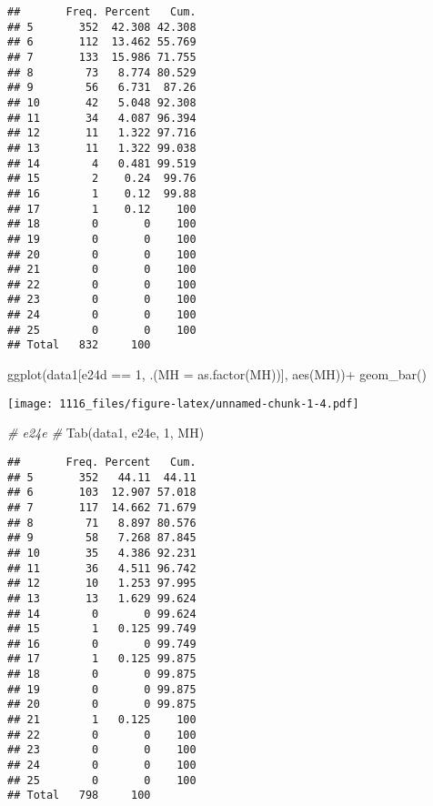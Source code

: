 \documentclass[
]{article}
\newenvironment{Shaded}{\begin{snugshade}}{\end{snugshade}}
\newcommand{\AttributeTok}[1]{\textcolor[rgb]{0.77,0.63,0.00}{#1}}
\newcommand{\CommentTok}[1]{\textcolor[rgb]{0.56,0.35,0.01}{\textit{#1}}}
\newcommand{\DecValTok}[1]{\textcolor[rgb]{0.00,0.00,0.81}{#1}}
\newcommand{\FunctionTok}[1]{\textcolor[rgb]{0.00,0.00,0.00}{#1}}
\newcommand{\NormalTok}[1]{#1}
\newcommand{\SpecialCharTok}[1]{\textcolor[rgb]{0.00,0.00,0.00}{#1}}
\newcommand{\StringTok}[1]{\textcolor[rgb]{0.31,0.60,0.02}{#1}}
\begin{document}
\begin{verbatim}
##       Freq. Percent   Cum.
## 5       352  42.308 42.308
## 6       112  13.462 55.769
## 7       133  15.986 71.755
## 8        73   8.774 80.529
## 9        56   6.731  87.26
## 10       42   5.048 92.308
## 11       34   4.087 96.394
## 12       11   1.322 97.716
## 13       11   1.322 99.038
## 14        4   0.481 99.519
## 15        2    0.24  99.76
## 16        1    0.12  99.88
## 17        1    0.12    100
## 18        0       0    100
## 19        0       0    100
## 20        0       0    100
## 21        0       0    100
## 22        0       0    100
## 23        0       0    100
## 24        0       0    100
## 25        0       0    100
## Total   832     100
\end{verbatim}

\begin{Shaded}
\begin{Highlighting}[]
\FunctionTok{ggplot}\NormalTok{(data1[e24d }\SpecialCharTok{==} \DecValTok{1}\NormalTok{, .(}\AttributeTok{MH =} \FunctionTok{as.factor}\NormalTok{(MH))], }\FunctionTok{aes}\NormalTok{(MH))}\SpecialCharTok{+}
    \FunctionTok{geom\_bar}\NormalTok{()}
\end{Highlighting}
\end{Shaded}

\texttt{[image: 1116\_files/figure-latex/unnamed-chunk-1-4.pdf]}

\begin{Shaded}
\begin{Highlighting}[]
\CommentTok{\# e24e \#}
\FunctionTok{Tab}\NormalTok{(data1, }\StringTok{\textquotesingle{}e24e\textquotesingle{}}\NormalTok{, }\DecValTok{1}\NormalTok{, }\StringTok{\textquotesingle{}MH\textquotesingle{}}\NormalTok{)}
\end{Highlighting}
\end{Shaded}

\begin{verbatim}
##       Freq. Percent   Cum.
## 5       352   44.11  44.11
## 6       103  12.907 57.018
## 7       117  14.662 71.679
## 8        71   8.897 80.576
## 9        58   7.268 87.845
## 10       35   4.386 92.231
## 11       36   4.511 96.742
## 12       10   1.253 97.995
## 13       13   1.629 99.624
## 14        0       0 99.624
## 15        1   0.125 99.749
## 16        0       0 99.749
## 17        1   0.125 99.875
## 18        0       0 99.875
## 19        0       0 99.875
## 20        0       0 99.875
## 21        1   0.125    100
## 22        0       0    100
## 23        0       0    100
## 24        0       0    100
## 25        0       0    100
## Total   798     100
\end{verbatim}
\end{document}
